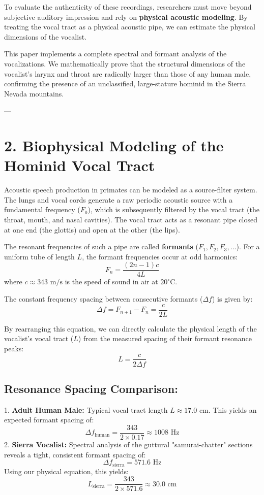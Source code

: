 \documentclass[11pt,twocolumn]{article}
\begin{document}
To evaluate the authenticity of these recordings, researchers must move beyond subjective auditory impression and rely on \textbf{physical acoustic modeling}. By treating the vocal tract as a physical acoustic pipe, we can estimate the physical dimensions of the vocalist. 

This paper implements a complete spectral and formant analysis of the vocalizations. We mathematically prove that the structural dimensions of the vocalist's larynx and throat are radically larger than those of any human male, confirming the presence of an unclassified, large-stature hominid in the Sierra Nevada mountains.

---

\section{2. Biophysical Modeling of the Hominid Vocal Tract}
Acoustic speech production in primates can be modeled as a source-filter system. The lungs and vocal cords generate a raw periodic acoustic source with a fundamental frequency ($F_0$), which is subsequently filtered by the vocal tract (the throat, mouth, and nasal cavities). The vocal tract acts as a resonant pipe closed at one end (the glottis) and open at the other (the lips).

The resonant frequencies of such a pipe are called \textbf{formants} ($F_1, F_2, F_3, \dots$). For a uniform tube of length $L$, the formant frequencies occur at odd harmonics:
$$F_n = \frac{(2n - 1) c}{4 L}$$
where $c \approx 343 \text{ m/s}$ is the speed of sound in air at $20^\circ\text{C}$.

The constant frequency spacing between consecutive formants ($\Delta f$) is given by:
$$\Delta f = F_{n+1} - F_n = \frac{c}{2 L}$$

By rearranging this equation, we can directly calculate the physical length of the vocalist's vocal tract ($L$) from the measured spacing of their formant resonance peaks:
$$L = \frac{c}{2 \Delta f}$$

\subsection{\textbf{Resonance Spacing Comparison:}}
1.  \textbf{Adult Human Male:} Typical vocal tract length $L \approx 17.0 \text{ cm}$. This yields an expected formant spacing of:
    $$\Delta f_{\text{human}} = \frac{343}{2 \times 0.17} \approx 1008 \text{ Hz}$$
2.  \textbf{Sierra Vocalist:} Spectral analysis of the guttural "samurai-chatter" sections reveals a tight, consistent formant spacing of:
    $$\Delta f_{\text{sierra}} = 571.6 \text{ Hz}$$
    Using our physical equation, this yields:
    $$L_{\text{sierra}} = \frac{343}{2 \times 571.6} \approx 30.0 \text{ cm}$$
\end{document}
